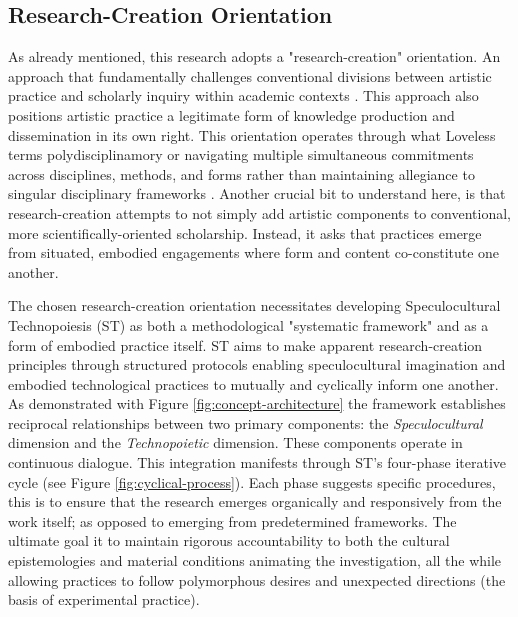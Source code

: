 \subsection{Research-Creation Orientation}

As already mentioned, this research adopts a "research-creation" orientation. An approach that fundamentally challenges conventional divisions between artistic practice and scholarly inquiry within academic contexts  \parencite{Loveless_2019}. This approach also positions artistic practice a legitimate form of knowledge production and dissemination in its own right. This orientation operates through what Loveless terms polydisciplinamory or navigating multiple simultaneous commitments across disciplines, methods, and forms rather than maintaining allegiance to singular disciplinary frameworks \parencite[62-76]{Loveless_2019}. Another crucial bit to understand here, is that research-creation attempts to not simply add artistic components to conventional, more scientifically-oriented scholarship. Instead, it asks that practices emerge from situated, embodied engagements where form and content co-constitute one another. %

The chosen research-creation orientation necessitates developing Speculocultural Technopoiesis (ST) as both a methodological "systematic framework" and as a form of embodied practice itself. ST aims to make apparent research-creation principles through structured protocols enabling speculocultural imagination and embodied technological practices to mutually and cyclically inform one another. As demonstrated with Figure \ref{fig:concept-architecture} the framework establishes reciprocal relationships between two primary components: the \emph{Speculocultural} dimension and the \emph{Technopoietic} dimension. These components operate in continuous dialogue. This integration manifests through ST's four-phase iterative cycle (see Figure \ref{fig:cyclical-process}). Each phase suggests specific procedures, this is to ensure that the research emerges organically and  responsively from the work itself; as opposed to emerging from predetermined frameworks. The ultimate goal it to maintain rigorous accountability to both the cultural epistemologies and material conditions animating the investigation, all the while allowing practices to follow polymorphous desires and unexpected directions (the basis of experimental practice).

